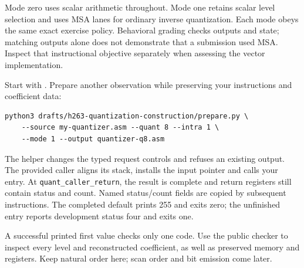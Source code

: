 Mode zero uses scalar arithmetic throughout. Mode one retains scalar level
selection and uses MSA lanes for ordinary inverse quantization. Each mode obeys
the same exact exercise policy. Behavioral grading checks outputs and state;
matching outputs alone does not demonstrate that a submission used MSA. Inspect
that instructional objective separately when assessing the vector implementation.

Start with . Prepare another
observation while preserving your instructions and coefficient data:
\begin{verbatim}
python3 drafts/h263-quantization-construction/prepare.py \
    --source my-quantizer.asm --quant 8 --intra 1 \
    --mode 1 --output quantizer-q8.asm
\end{verbatim}
The helper changes the typed request controls and refuses an existing output.
The provided caller aligns its stack, installs the input pointer and calls your
entry. At \texttt{quant\_caller\_return}, the result is complete and return
registers still contain status and count. Named status/count fields are copied
by subsequent instructions. The completed default prints 255 and exits zero;
the unfinished entry reports development status four and exits one.

A successful printed first value checks only one code. Use the public checker to
inspect every level and reconstructed coefficient, as well as preserved memory
and registers. Keep natural order here; scan order and bit emission come later.
